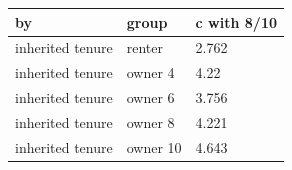 \begingroup\small
\setlength{\tabcolsep}{3pt}
\renewcommand{\arraystretch}{1.04}
\begin{tabularx}{\linewidth}{XXX}
\toprule
by & group & c with 8/10 \\
\midrule
inherited tenure & renter & 2.762 \\
inherited tenure & owner 4 & 4.22 \\
inherited tenure & owner 6 & 3.756 \\
inherited tenure & owner 8 & 4.221 \\
inherited tenure & owner 10 & 4.643 \\
\bottomrule
\end{tabularx}
\endgroup
